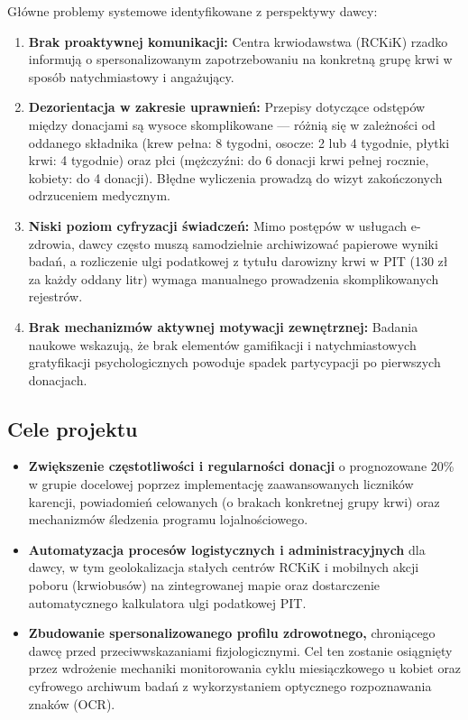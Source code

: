 \documentclass[11pt, a4paper]{article}
\begin{document}
Główne problemy systemowe identyfikowane z perspektywy dawcy:

\begin{enumerate}
  \item \textbf{Brak proaktywnej komunikacji:} Centra krwiodawstwa (RCKiK) rzadko informują
        o spersonalizowanym zapotrzebowaniu na konkretną grupę krwi w sposób natychmiastowy
        i angażujący.

  \item \textbf{Dezorientacja w zakresie uprawnień:} Przepisy dotyczące odstępów między
        donacjami są wysoce skomplikowane — różnią się w zależności od oddanego składnika
        (krew pełna: 8 tygodni, osocze: 2 lub 4 tygodnie, płytki krwi: 4 tygodnie) oraz
        płci (mężczyźni: do 6 donacji krwi pełnej rocznie, kobiety: do 4 donacji).
        Błędne wyliczenia prowadzą do wizyt zakończonych odrzuceniem medycznym.

  \item \textbf{Niski poziom cyfryzacji świadczeń:} Mimo postępów w usługach e-zdrowia,
        dawcy często muszą samodzielnie archiwizować papierowe wyniki badań, a rozliczenie
        ulgi podatkowej z tytułu darowizny krwi w PIT (130 zł za każdy oddany litr) wymaga
        manualnego prowadzenia skomplikowanych rejestrów.

  \item \textbf{Brak mechanizmów aktywnej motywacji zewnętrznej:} Badania naukowe wskazują,
        że brak elementów gamifikacji i natychmiastowych gratyfikacji psychologicznych
        powoduje spadek partycypacji po pierwszych donacjach.
\end{enumerate}

\subsection{Cele projektu}

\begin{itemize}
  \item \textbf{Zwiększenie częstotliwości i regularności donacji} o prognozowane 20\%
        w grupie docelowej poprzez implementację zaawansowanych liczników karencji,
        powiadomień celowanych (o brakach konkretnej grupy krwi) oraz mechanizmów
        śledzenia programu lojalnościowego.

  \item \textbf{Automatyzacja procesów logistycznych i administracyjnych} dla dawcy,
        w tym geolokalizacja stałych centrów RCKiK i mobilnych akcji poboru (krwiobusów)
        na zintegrowanej mapie oraz dostarczenie automatycznego kalkulatora ulgi
        podatkowej PIT.

  \item \textbf{Zbudowanie spersonalizowanego profilu zdrowotnego,} chroniącego dawcę
        przed przeciwwskazaniami fizjologicznymi. Cel ten zostanie osiągnięty przez
        wdrożenie mechaniki monitorowania cyklu miesiączkowego u kobiet oraz cyfrowego
        archiwum badań z wykorzystaniem optycznego rozpoznawania znaków (OCR).
\end{itemize}
\end{document}
